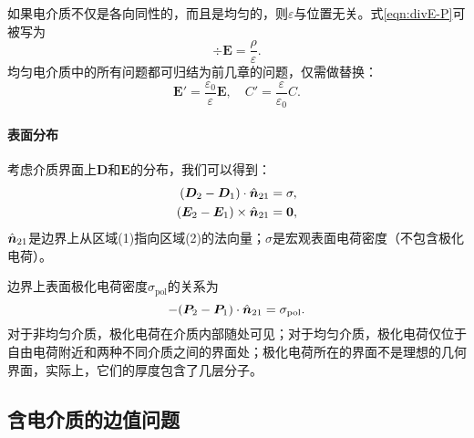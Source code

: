 如果电介质不仅是各向同性的，而且是均匀的，则$\varepsilon$与位置无关。式\eqref{eqn:divE-P}可被写为 
\begin{equation}
    \div\bm E=\frac\rho\varepsilon.
\end{equation}
均匀电介质中的所有问题都可归结为前几章的问题，仅需做替换：
\begin{equation}
    \bm E'=\frac{\varepsilon_0}\varepsilon\bm E,\quad C'=\frac\varepsilon{\varepsilon_0}C.
\end{equation}
\paragraph{表面分布}
考虑介质界面上$\bm D$和$\bm E$的分布，我们可以得到：
\begin{align}
    \label{eqn:Dn2-Dn1}
    (\bm D_2-\bm D_1)\cdot\mathop{}\!\hat{\bm{n}}_{21}&=\sigma,\\
    \label{eqn:Et2-Et1}
    (\bm E_2-\bm E_1)\times\mathop{}\!\hat{\bm{n}}_{21}&=\bm 0,
\end{align}
$\mathop{}\!\hat{\bm{n}}_{21}$是边界上从区域(1)指向区域(2)的法向量；$\sigma$是宏观表面电荷密度（不包含极化电荷）。

边界上表面极化电荷密度$\sigma_\text{pol}$的关系为
\begin{equation}
    \label{eqn:Pn2-Pn1}
    -(\bm P_2-\bm P_1)\cdot\mathop{}\!\hat{\bm{n}}_{21}=\sigma_\text{pol}.
\end{equation}
对于非均匀介质，极化电荷在介质内部随处可见；对于均匀介质，极化电荷仅位于自由电荷附近和两种不同介质之间的界面处；极化电荷所在的界面不是理想的几何界面，实际上，它们的厚度包含了几层分子。

\subsection{含电介质的边值问题}
\label{ssec:boundary-value problem with dielectrics}

